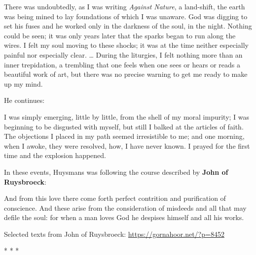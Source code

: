 \begin{quotex}
There was undoubtedly, as I was writing \emph{Against Nature}, a land-shift, the earth was being mined to lay foundations of which I was unaware. God was digging to set his fuses and he worked only in the darkness of the soul, in the night. Nothing could be seen; it was only years later that the sparks began to run along the wires. I felt my soul moving to these shocks; it was at the time neither especially painful nor especially clear. … During the liturgies, I felt nothing more than an inner trepidation, a trembling that one feels when one sees or hears or reads a beautiful work of art, but there was no precise warning to get me ready to make up my mind. 

\end{quotex}
He continues:

\begin{quotex}
I was simply emerging, little by little, from the shell of my moral impurity; I was beginning to be disgusted with myself, but still I balked at the articles of faith. The objections I placed in my path seemed irresistible to me; and one morning, when I awoke, they were resolved, how, I have never known. I prayed for the first time and the explosion happened. 

\end{quotex}
In these events, Huysmans was following the course described by \textbf{John of Ruysbroeck}:

\begin{quotex}
And from this love there come forth perfect contrition and purification of conscience. And these arise from the consideration of misdeeds and all that may defile the soul: for when a man loves God he despises himself and all his works. 

\end{quotex}
Selected texts from John of Ruysbroeck: \url{https://gornahoor.net/?p=8452}


\hfill




\begin{center}* * *\end{center}


